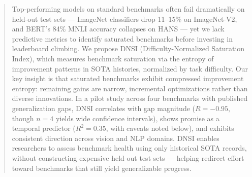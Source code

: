 \begin{abstract}
Top-performing models on standard benchmarks often fail dramatically on held-out test sets --- ImageNet classifiers drop 11--15\% on ImageNet-V2, and BERT's 84\% MNLI accuracy collapses on HANS --- yet we lack predictive metrics to identify saturated benchmarks before investing in leaderboard climbing. We propose DNSI (Difficulty-Normalized Saturation Index), which measures benchmark saturation via the entropy of improvement patterns in SOTA histories, normalized by task difficulty. Our key insight is that saturated benchmarks exhibit compressed improvement entropy: remaining gains are narrow, incremental optimizations rather than diverse innovations. In a pilot study across four benchmarks with published generalization gaps, DNSI correlates with gap magnitude ($R = -0.95$, though $n=4$ yields wide confidence intervals), shows promise as a temporal predictor ($R^2 = 0.35$, with caveats noted below), and exhibits consistent direction across vision and NLP domains. DNSI enables researchers to assess benchmark health using only historical SOTA records, without constructing expensive held-out test sets --- helping redirect effort toward benchmarks that still yield generalizable progress.
\end{abstract}
